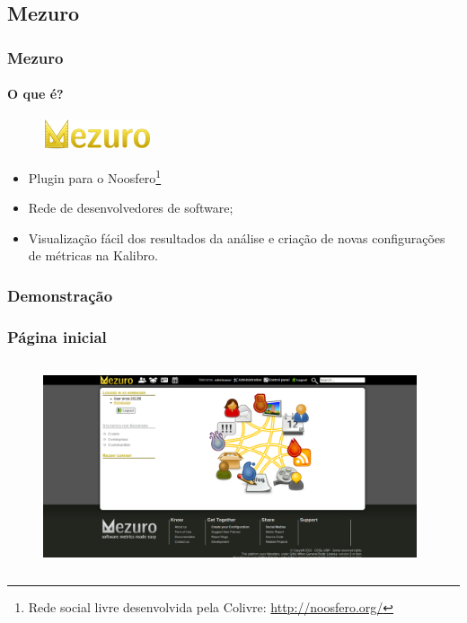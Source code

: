 \documentclass{beamer}
\begin{document}
  \subsection{Mezuro}

  \begin{frame}
    \frametitle{Mezuro}
    \framesubtitle{O que é?}

    \begin{figure}
      \begin{flushleft}
        \includegraphics{images/logo-mezuro.png}
        \label{fig:logo-mezuro}
      \end{flushleft}
    \end{figure}

    \begin{itemize}
      \item Plugin para o Noosfero\footnote{Rede social livre desenvolvida pela Colivre: \url{http://noosfero.org/}}
      \item Rede de desenvolvedores de software;
      \item Visualização fácil dos resultados da análise e criação de novas configurações de métricas na Kalibro.
    \end{itemize}

  \end{frame}

  \subsubsection{Demonstração}

    \begin{frame}
      \frametitle{Página inicial}
      \framesubtitle{}

      \begin{figure}
        \begin{center}
          \includegraphics[width=11cm, height=6cm]{images/00-home.png}
          \label{fig:home}
        \end{center}
      \end{figure}

    \end{frame}
\end{document}
